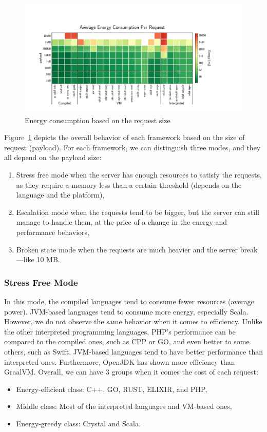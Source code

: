 \begin{figure}[!hbt]
    \begin{center}
        \includegraphics[width=1.2\linewidth]{imgs/energy_cost_payload}
    \end{center}
    \caption{Energy consumption based on the request size}\label{fig:energy_cost_payload}
\end{figure}
Figure~\ref{fig:energy_cost_payload} depicts the overall behavior of each framework based on the size of request (payload).
For each framework, we can distinguish three modes, and they all depend on the payload size:
\begin{enumerate}
    \item \textsf{Stress free} mode when the server has enough resources to satisfy the requests, as they require a memory less than a certain threshold (depends on the language and the platform),
    \item \textsf{Escalation} mode when the requests tend to be bigger, but the server can still manage to handle them, at the price of a change in the energy and performance behaviors,
    \item \textsf{Broken state} mode when the requests are much heavier and the server break—like 10 MB.%
\end{enumerate}

\subsubsection{Stress Free Mode}
In this mode, the compiled languages tend to consume fewer resources (average power).
JVM-based languages tend to consume more energy, especially Scala.
However, we do not observe the same behavior when it comes to efficiency.
Unlike the other interpreted programming languages, PHP's performance can be compared to the compiled ones, such as CPP or GO, and even better to some others, such as Swift.
JVM-based languages tend to have better performance than interpreted ones.
Furthermore, OpenJDK has shown more efficiency than GraalVM.
Overall, we can have 3 groups when it comes the cost of each request:
\begin{itemize}
    \item Energy-efficient class: C++, GO, RUST, ELIXIR, and PHP,
    \item Middle class: Most of the interpreted languages and VM-based ones,
    \item Energy-greedy class: Crystal and Scala.
\end{itemize}

